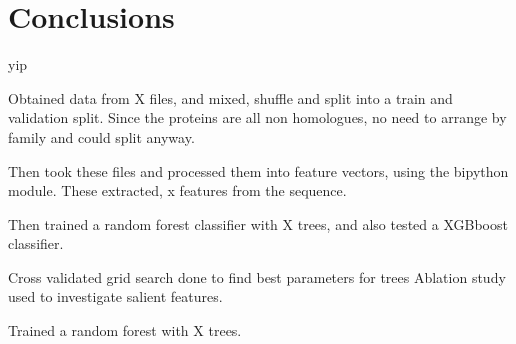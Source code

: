 \documentclass{bioinfo}
\begin{document}
\section{Conclusions}









  







\newpage
yip
\newpage

Obtained data from X files, and mixed, shuffle and split into a train and validation split. Since the proteins are all non homologues, no need to arrange by family and could split anyway. 

Then took these files and processed them into feature vectors, using the bipython module. These extracted, x features from the sequence. 

Then trained a random forest classifier with X trees, and also tested a XGBboost classifier.

Cross validated grid search done to find best parameters for trees
Ablation study used to investigate salient features.

Trained a random forest with X trees. 
\end{document}
